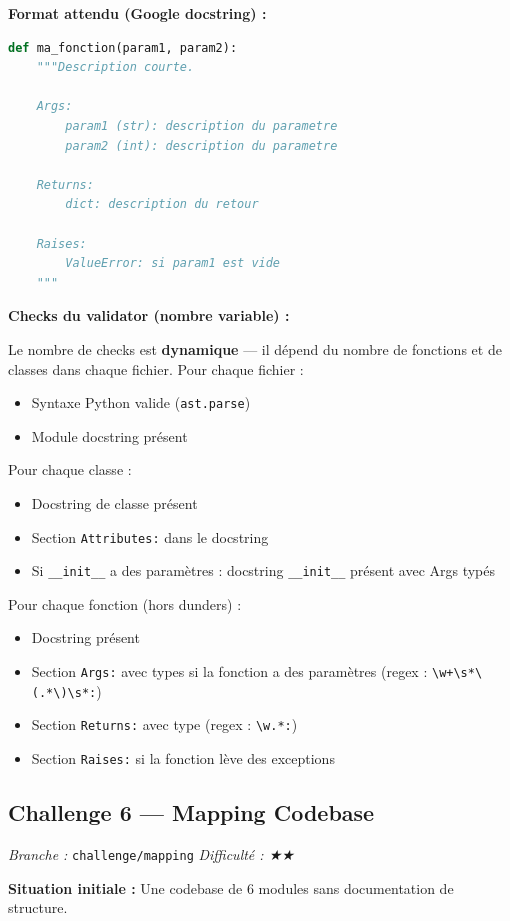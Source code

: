 \documentclass[11pt,a4paper]{article}
\newcommand{\code}[1]{\texttt{#1}}
\begin{document}
\textbf{Format attendu (Google docstring) :}
\begin{lstlisting}[language=Python]
def ma_fonction(param1, param2):
    """Description courte.

    Args:
        param1 (str): description du parametre
        param2 (int): description du parametre

    Returns:
        dict: description du retour

    Raises:
        ValueError: si param1 est vide
    """
\end{lstlisting}

\textbf{Checks du validator (nombre variable) :}

Le nombre de checks est \textbf{dynamique} — il dépend du nombre de fonctions
et de classes dans chaque fichier. Pour chaque fichier :
\begin{itemize}
  \item Syntaxe Python valide (\code{ast.parse})
  \item Module docstring présent
\end{itemize}
Pour chaque classe :
\begin{itemize}
  \item Docstring de classe présent
  \item Section \code{Attributes:} dans le docstring
  \item Si \code{\_\_init\_\_} a des paramètres : docstring \code{\_\_init\_\_} présent avec Args typés
\end{itemize}
Pour chaque fonction (hors dunders) :
\begin{itemize}
  \item Docstring présent
  \item Section \code{Args:} avec types si la fonction a des paramètres
        (regex : \verb|\w+\s*\(.*\)\s*:|)
  \item Section \code{Returns:} avec type (regex : \verb|\w.*:|)
  \item Section \code{Raises:} si la fonction lève des exceptions
\end{itemize}

\subsection{Challenge 6 — Mapping Codebase}
\textit{Branche :} \code{challenge/mapping} \quad \textit{Difficulté : ★★}

\textbf{Situation initiale :}
Une codebase de 6 modules sans documentation de structure.
\end{document}
